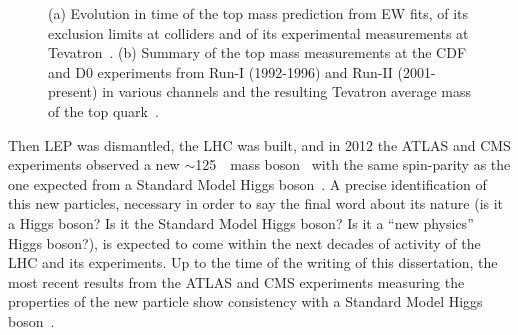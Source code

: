 \begin{figure}[hbtp]
\begin{center}
\caption{(a) Evolution in time of the top mass prediction from
EW fits, of its exclusion limits at colliders and of its
experimental measurements at Tevatron~\cite{Galtieri:2011yd}.
(b) Summary of the top mass measurements at the CDF and D0 experiments
from Run-I (1992-1996) and Run-II (2001-present) 
in various channels and the resulting Tevatron average
 mass of the top quark~\cite{CDF:2013jga}.}
\end{center}
\end{figure}




Then LEP was dismantled, the LHC was built, and in 2012 
the ATLAS and CMS experiments
observed a new $\sim$125~\gev\ mass boson~\cite{2012gk,Chatrchyan201230}
with the same spin-parity as the one expected from a Standard Model
Higgs boson~\cite{Aad:2013xqa,CMShiggsspin}. 
A precise identification of this new particles, necessary
in order to say the final word about its nature (is it a Higgs boson?
Is it the Standard Model Higgs boson? Is it a ``new physics'' Higgs boson?),
is expected to come within the next decades of activity of the LHC and its
experiments. Up to the time of the writing of this dissertation, the most
recent results from the ATLAS and CMS experiments measuring the
properties of the new particle show consistency with a Standard
Model Higgs boson~\cite{Aad:2013wqa,CMS-PAS-HIG-13-005}.

